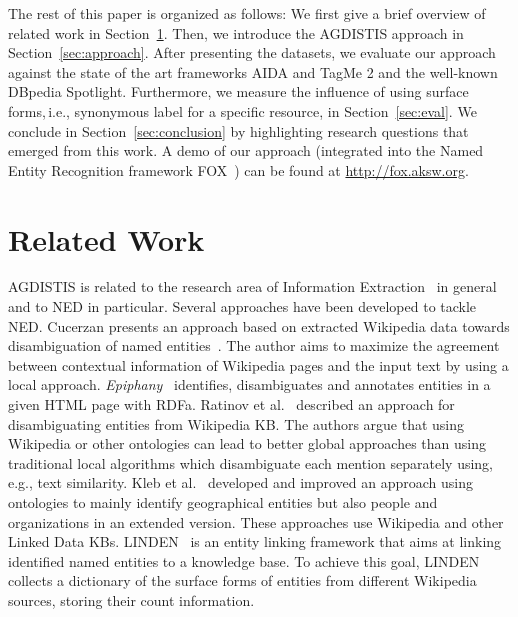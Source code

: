 \documentclass{llncs}
\begin{document}
The rest of this paper is organized as follows: We first give a brief overview of related work in Section~\ref{sec:relatedwork}. 
Then, we introduce the AGDISTIS approach in Section~\ref{sec:approach}. %
After presenting the datasets, we evaluate our approach against the state of the art frameworks AIDA and TagMe 2 and the well-known DBpedia Spotlight. 
Furthermore, we measure the influence of using surface forms,\,i.e., synonymous label for a specific resource, in Section~\ref{sec:eval}. 
We conclude in Section~\ref{sec:conclusion} by highlighting research questions that emerged from this work.
A demo of our approach (integrated into the Named Entity Recognition framework FOX~\cite{FOX}) can be found at \url{http://fox.aksw.org}. 


\section{Related Work}
\label{sec:relatedwork}
AGDISTIS is related to the research area of Information Extraction~\cite{nad:sek} in general and to NED in particular.
Several approaches have been developed to tackle NED. 
Cucerzan presents an approach based on extracted Wikipedia data towards disambiguation of named entities~\cite{Cucerzan07}.
The author aims to maximize the agreement between contextual information of Wikipedia pages and the input text by using a local approach.
\emph{Epiphany}~\cite{epiphany} identifies, disambiguates and annotates entities in a given HTML page with RDFa. 
Ratinov et al.~\cite{rat:rot} described an approach for disambiguating entities from Wikipedia KB. 
The authors argue that using Wikipedia or other ontologies can lead to better global approaches than using traditional local algorithms which disambiguate each mention separately using,\,e.g., text similarity. %
Kleb et al.~\cite{Kleb11WIMS,KlebESWC10} developed and improved an approach using ontologies to mainly identify geographical entities but also people and organizations in an extended version. 
These approaches use Wikipedia and other Linked Data KBs.
LINDEN~\cite{LINDEN} is an entity linking framework that aims at linking identified named entities to a knowledge base.
To achieve this goal, LINDEN collects a dictionary of the surface forms of entities from different Wikipedia sources, storing their count information.
\end{document}

